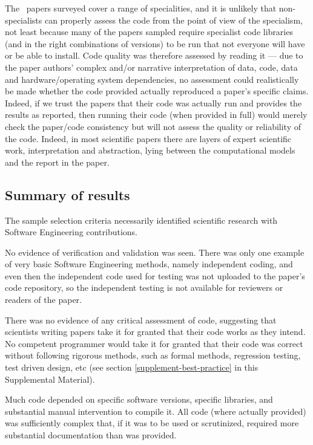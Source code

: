 \documentclass[10pt,a4paper]{article}
\def\supplement{Supplemental Material}
\begin{document}
The \the\dataN\ papers surveyed cover a range of specialities, and it is unlikely that non-specialists can properly assess the code from the point of view of the specialism, not least because many of the papers sampled require specialist code libraries (and in the right combinations of versions) to be run that not everyone will have or be able to install. Code quality was therefore assessed by reading it --- due to the paper authors' complex and/or narrative interpretation of data, code, data and hardware/operating system dependencies, no assessment could realistically be made whether the code provided actually reproduced a paper's specific claims. Indeed, if we trust the papers that their code was actually run and provides the results as reported, then running their code (when provided in full) would merely check the paper/code consistency but will not assess the quality or reliability of the code. Indeed, in most scientific papers there are layers of expert scientific work, interpretation and abstraction, lying between the computational models and the report in the paper.

\subsection{Summary of results}
\label{supplement-summary-of-results}
The sample selection criteria necessarily identified scientific research with Software Engineering contributions. 

No evidence of verification and validation was seen. There was only one example of very basic Software Engineering methods, namely independent coding, and even then the independent code used for testing was not uploaded to the paper's code repository, so the independent testing is not available for reviewers or readers of the paper.

There was no evidence of any critical assessment of code, suggesting that scientists writing papers take it for granted that their code works as they intend. No competent programmer would take it for granted that their code was correct without following rigorous methods, such as formal methods, regression testing, test driven design, etc (see section \ref{supplement-best-practice} in this \supplement).

Much code depended on specific software versions, specific libraries, and substantial manual intervention to compile it. All code (where actually provided) was sufficiently complex that, if it was to be used or scrutinized, required more substantial documentation than was provided.
\end{document}
